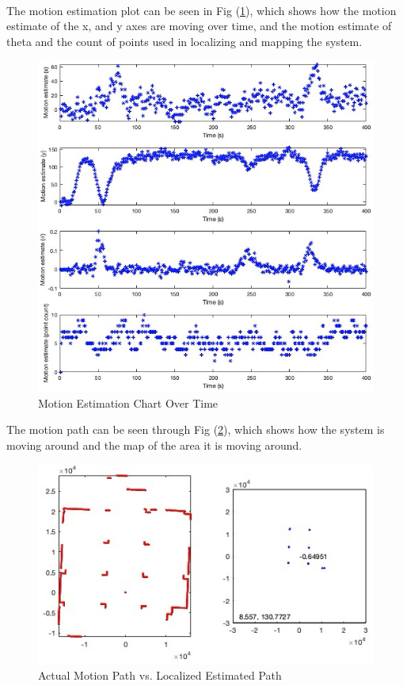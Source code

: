 \label{fig:MotionEst.}
\\
The motion estimation plot can be seen in Fig (\ref{fig:MotionEstimation}), which shows how the motion estimate of the x, and y axes are moving over time, and the motion estimate of theta and the count of points used in localizing and mapping the system. \\
\begin{figure}[H]
  \centering
 \includegraphics[width=0.8\linewidth, height=0.7\linewidth]{FastSLAM/Motion_Estimate.png}  
\caption{Motion Estimation Chart Over Time}
\label{fig:MotionEstimation}
\end{figure}
The motion path can be seen through Fig (\ref{fig:MotionPath}), which shows how the system is moving around and the map of the area it is moving around. \\
\begin{figure}[H]
  \centering
 \includegraphics[width=0.7\linewidth, height=0.5\linewidth]{FastSLAM/Motion_Path.png}  
\caption{Actual Motion Path vs. Localized Estimated Path}
\label{fig:MotionPath}
\end{figure}

